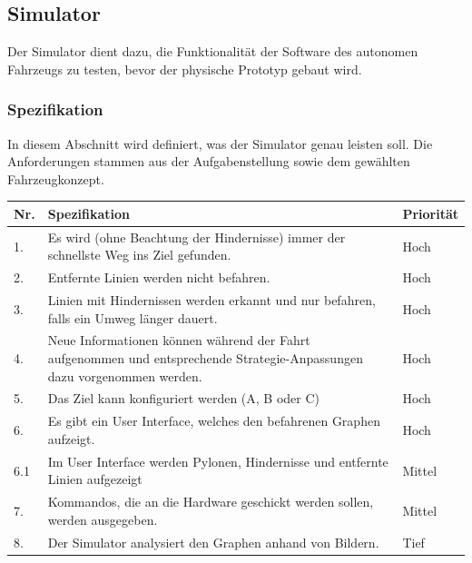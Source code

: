\documentclass[../main.tex]{subfiles}
\begin{document}
\newpage
\subsection{Simulator}\label{simulator}

Der Simulator dient dazu, die Funktionalität der Software des autonomen Fahrzeugs zu testen, bevor der physische Prototyp gebaut wird.\\

\subsubsection{Spezifikation}

In diesem Abschnitt wird definiert, was der Simulator genau leisten soll. Die Anforderungen stammen aus der Aufgabenstellung sowie dem gewählten Fahrzeugkonzept.

\begin{table}[htbp!]
    \centering
    \begin{tabularx}{\textwidth}{| l | X | l |}
        \hline
        \textbf{Nr.} & \textbf{Spezifikation} & \textbf{Priorität} \\ \hline
        1. & Es wird (ohne Beachtung der Hindernisse) immer der schnellste Weg ins Ziel gefunden. & Hoch \\ \hline
        2. & Entfernte Linien werden nicht befahren. & Hoch \\ \hline
        3. & Linien mit Hindernissen werden erkannt und nur befahren, falls ein Umweg länger dauert. & Hoch \\ \hline
        4. & Neue Informationen können während der Fahrt aufgenommen und entsprechende Strategie-Anpassungen dazu vorgenommen werden. & Hoch \\ \hline
        5. & Das Ziel kann konfiguriert werden (A, B oder C) & Hoch \\ \hline
        6. & Es gibt ein User Interface, welches den befahrenen Graphen aufzeigt. & Hoch \\ \hline
        6.1 & Im User Interface werden Pylonen, Hindernisse und entfernte Linien aufgezeigt & Mittel \\ \hline
        7. & Kommandos, die an die Hardware geschickt werden sollen, werden ausgegeben. & Mittel \\ \hline
        8. & Der Simulator analysiert den Graphen anhand von Bildern. & Tief \\ \hline
    \end{tabularx}
\end{table}
\end{document}
